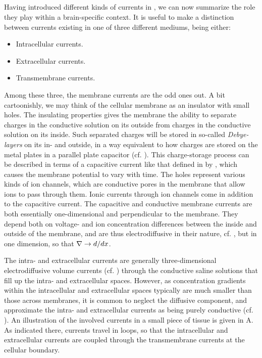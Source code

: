 \subsection{}
\label{sec:Basics:braincurrents}
Having introduced different kinds of currents in , we can now summarize the role they play within a brain-specific context. It is useful to make a distinction between currents existing in one of three different mediums, being either:
\begin{itemize}
\item Intracellular currents. 
\item Extracellular currents. 
\item Transmembrane currents. 
\end{itemize}

Among these three, the membrane currents are the odd ones out. A bit cartoonishly, we may think of the cellular membrane as an insulator with small holes. The insulating properties gives the membrane the ability to separate charges in the conductive solution on its outside from charges in the conductive solution on its inside. Such separated charges will be stored in so-called \textit{Debye-layers} on its in- and outside, in a way equivalent to how charges are stored on the metal plates in a parallel plate capacitor (cf. ). This charge-storage process can be described in terms of a capacitive current like that defined in by , which causes the membrane potential to vary with time. The holes represent various kinds of ion channels, which are conductive pores in the membrane that allow ions to pass through them. Ionic currents through ion channels come in addition to the capacitive current. The capacitive and conductive membrane currents are both essentially one-dimensional and perpendicular to the membrane. They depend both on voltage- and ion concentration differences between the inside and outside of the membrane, and are thus electrodiffusive in their nature, cf. , but in one dimension, so that ${\bf \nabla} \rightarrow d/dx$.

The intra- and extracellular currents are generally three-dimensional electrodiffusive volume currents (cf. ) through the conductive saline solutions that fill up the intra- and extracellular spaces. However, as concentration gradients within the intracellular and extracellular spaces typically are much smaller than those across membranes, it is common to neglect the diffusive component, and approximate the intra- and extracellular currents as being purely conductive (cf. ). An illustration of the involved currents in a small piece of tissue is given in A. As indicated there, currents travel in loops, so that the intracellular and extracellular currents are coupled through the transmembrane currents at the cellular boundary. 

